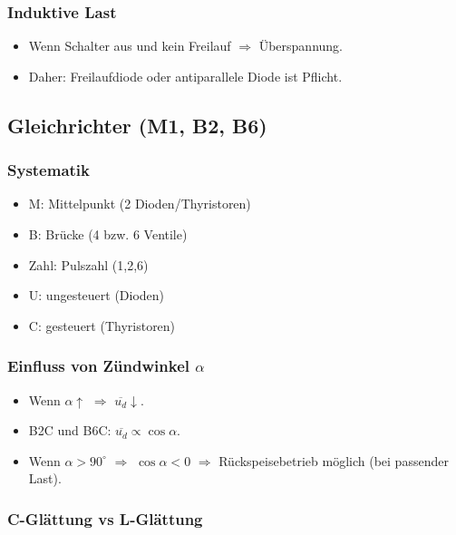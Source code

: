 \subsubsection{Induktive Last}

\begin{itemize}
\item Wenn Schalter aus und kein Freilauf $\Rightarrow$ Überspannung.
\item Daher: Freilaufdiode oder antiparallele Diode ist Pflicht.
\end{itemize}

\subsection{Gleichrichter (M1, B2, B6)}

\subsubsection{Systematik}

\begin{itemize}
\item M: Mittelpunkt (2 Dioden/Thyristoren)
\item B: Brücke (4 bzw. 6 Ventile)
\item Zahl: Pulszahl (1,2,6)
\item U: ungesteuert (Dioden)
\item C: gesteuert (Thyristoren)
\end{itemize}

\subsubsection{Einfluss von Zündwinkel $\alpha$}

\begin{itemize}
\item Wenn $\alpha\uparrow$ $\Rightarrow$ $\overline{u_d}\downarrow$.
\item B2C und B6C: $\overline{u_d}\propto \cos\alpha$.
\item Wenn $\alpha>90^\circ$ $\Rightarrow$ $\cos\alpha<0$ $\Rightarrow$ Rückspeisebetrieb möglich (bei passender Last).
\end{itemize}

\subsubsection{C-Glättung vs L-Glättung}

